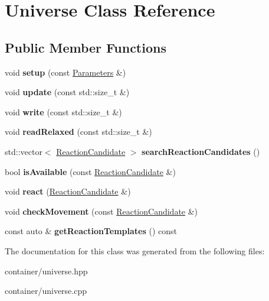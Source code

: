 \hypertarget{classUniverse}{}\section{Universe Class Reference}
\label{classUniverse}
\subsection*{Public Member Functions}
\begin{DoxyCompactItemize}
\item 
\mbox{\label{classUniverse_a9e3bc4f94ef91856fed80ccb5fab0081}} 
void {\bfseries setup} (const \mbox{\hyperlink{classParameters}{Parameters}} \&)
\item 
\mbox{\label{classUniverse_a6a93f69c9178fc17789afbcac9920e55}} 
void {\bfseries update} (const std\+::size\+\_\+t \&)
\item 
\mbox{\label{classUniverse_af75ed4503afd48ecf21618b0a1026bf1}} 
void {\bfseries write} (const std\+::size\+\_\+t \&)
\item 
\mbox{\label{classUniverse_a47d6b992adc8a541cdb75605df055d43}} 
void {\bfseries read\+Relaxed} (const std\+::size\+\_\+t \&)
\item 
\mbox{\label{classUniverse_a2d33d546d563a374544c0d0e9c335397}} 
std\+::vector$<$ \mbox{\hyperlink{classReactionCandidate}{Reaction\+Candidate}} $>$ {\bfseries search\+Reaction\+Candidates} ()
\item 
\mbox{\label{classUniverse_a31495ec00a1acff8471f4fabf12c7b93}} 
bool {\bfseries is\+Available} (const \mbox{\hyperlink{classReactionCandidate}{Reaction\+Candidate}} \&)
\item 
\mbox{\label{classUniverse_a453f9af0190ca4fccb44da223bd4bae4}} 
void {\bfseries react} (\mbox{\hyperlink{classReactionCandidate}{Reaction\+Candidate}} \&)
\item 
\mbox{\label{classUniverse_a223fed1cf57eda7e2b26de524349058a}} 
void {\bfseries check\+Movement} (const \mbox{\hyperlink{classReactionCandidate}{Reaction\+Candidate}} \&)
\item 
\mbox{\label{classUniverse_af9774b79ba2478354800c4e676981aa0}} 
const auto \& {\bfseries get\+Reaction\+Templates} () const
\end{DoxyCompactItemize}


The documentation for this class was generated from the following files\+:\begin{DoxyCompactItemize}
\item 
container/universe.\+hpp\item 
container/universe.\+cpp\end{DoxyCompactItemize}

